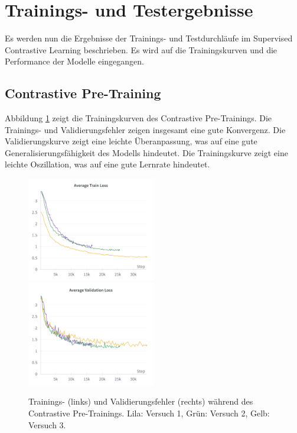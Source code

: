\section{Trainings- und Testergebnisse} \label{sec:supcon-results}

Es werden nun die Ergebnisse der Trainings- und Testdurchläufe im Supervised Contrastive Learning beschrieben. Es wird auf die Trainingskurven und die Performance der Modelle eingegangen.

\subsection{Contrastive Pre-Training} \label{sec:supcon-pre-results}

Abbildung \ref{fig:supcon-pre-loss} zeigt die Trainingskurven des Contrastive Pre-Trainings. Die Trainings- und Validierungsfehler zeigen insgesamt eine gute Konvergenz. Die Validierungskurve zeigt eine leichte Überanpassung, was auf eine gute Generalisierungsfähigkeit des Modells hindeutet. Die Trainingskurve zeigt eine leichte Oszillation, was auf eine gute Lernrate hindeutet.

\begin{figure}[h]
	\centering
	\includegraphics[width=0.5\textwidth]{figure_results_supcon-pre_avg-train-loss.png}%
	\includegraphics[width=0.5\textwidth]{figure_results_supcon-pre_avg-val-loss.png}
	\caption{Trainings- (links) und Validierungsfehler (rechts) während des Contrastive Pre-Trainings. Lila: Versuch 1, Grün: Versuch 2, Gelb: Versuch 3.}
	\label{fig:supcon-pre-loss}
\end{figure}

